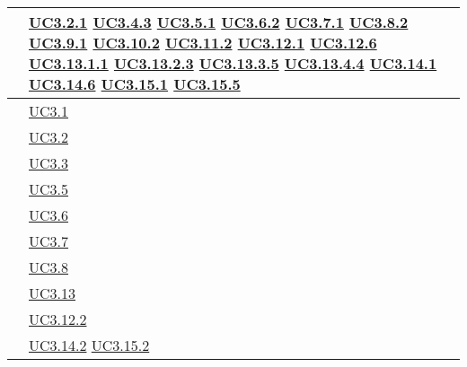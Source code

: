 \begin{longtable}{|P{6cm}|P{6cm}|}
	\hline {} & \hyperref[UC3.2.1]{UC3.2.1} \linebreak \hyperref[UC3.4.3]{UC3.4.3} \linebreak \hyperref[UC3.5.1]{UC3.5.1} \linebreak \hyperref[UC3.6.2]{UC3.6.2} \linebreak \hyperref[UC3.7.1]{UC3.7.1} \linebreak \hyperref[UC3.8.2]{UC3.8.2} \linebreak \hyperref[UC3.9.1]{UC3.9.1} \linebreak \hyperref[UC3.10.2]{UC3.10.2} \linebreak \hyperref[UC3.11.2]{UC3.11.2} \linebreak  \hyperref[UC3.12.1]{UC3.12.1} \linebreak \hyperref[UC3.12.6]{UC3.12.6} \linebreak  \hyperref[UC3.13.1.1]{UC3.13.1.1} \linebreak \hyperref[UC3.13.2.3]{UC3.13.2.3} \linebreak \hyperref[UC3.13.3.5]{UC3.13.3.5} \linebreak \hyperref[UC3.13.4.4]{UC3.13.4.4} \linebreak \hyperref[UC3.14.1]{UC3.14.1} \linebreak \hyperref[UC3.14.6]{UC3.14.6} \linebreak \hyperref[UC3.15.1]{UC3.15.1} \linebreak \hyperref[UC3.15.5]{UC3.15.5} \\
	\hline {} & \hyperref[UC3.1]{UC3.1} \\
	\hline {} & \hyperref[UC3.2]{UC3.2} \\
	\hline {} & \hyperref[UC3.3]{UC3.3} \\
	\hline {} & \hyperref[UC3.5]{UC3.5} \\
	\hline {} & \hyperref[UC3.6]{UC3.6} \\
	\hline {} & \hyperref[UC3.7]{UC3.7} \\
	\hline {} & \hyperref[UC3.8]{UC3.8} \\
	\hline {} & \hyperref[UC3.13]{UC3.13} \\
	\hline {} & \hyperref[UC3.12.2]{UC3.12.2} \\
	\hline {} & \hyperref[UC3.14.2]{UC3.14.2} \linebreak \hyperref[UC3.15.2]{UC3.15.2} \\

\end{longtable}
